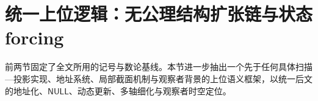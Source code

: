 \section{统一上位逻辑：无公理结构扩张链与状态 forcing}\label{sec:logic-expansion-chain}

前两节固定了全文所用的记号与数论基线。本节进一步抽出一个先于任何具体扫描—投影实现、地址系统、局部截面机制与观察者背景的上位语义框架，以统一后文的地址化、\(\mathsf{NULL}\)、动态更新、多轴细化与观察者时空定位。








